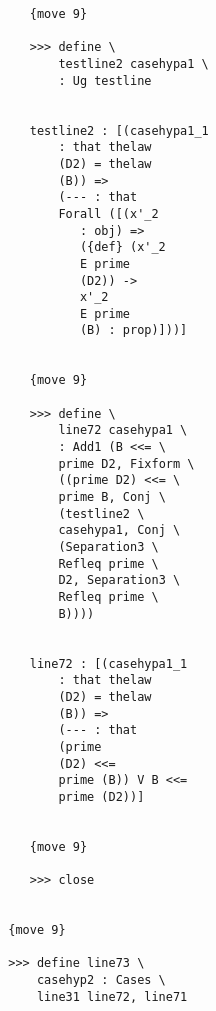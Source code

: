 \documentclass[12pt]{article}
\begin{document}
\begin{verbatim}
                              {move 9}

                              >>> define \
                                  testline2 casehypa1 \
                                  : Ug testline


                              testline2 : [(casehypa1_1 
                                  : that thelaw 
                                  (D2) = thelaw 
                                  (B)) => 
                                  (--- : that 
                                  Forall ([(x'_2 
                                     : obj) => 
                                     ({def} (x'_2 
                                     E prime 
                                     (D2)) -> 
                                     x'_2 
                                     E prime 
                                     (B) : prop)]))]


                              {move 9}

                              >>> define \
                                  line72 casehypa1 \
                                  : Add1 (B <<= \
                                  prime D2, Fixform \
                                  ((prime D2) <<= \
                                  prime B, Conj \
                                  (testline2 \
                                  casehypa1, Conj \
                                  (Separation3 \
                                  Refleq prime \
                                  D2, Separation3 \
                                  Refleq prime \
                                  B))))


                              line72 : [(casehypa1_1 
                                  : that thelaw 
                                  (D2) = thelaw 
                                  (B)) => 
                                  (--- : that 
                                  (prime 
                                  (D2) <<= 
                                  prime (B)) V B <<= 
                                  prime (D2))]


                              {move 9}

                              >>> close


                           {move 9}

                           >>> define line73 \
                               casehyp2 : Cases \
                               line31 line72, line71



\end{verbatim}
\end{document}
